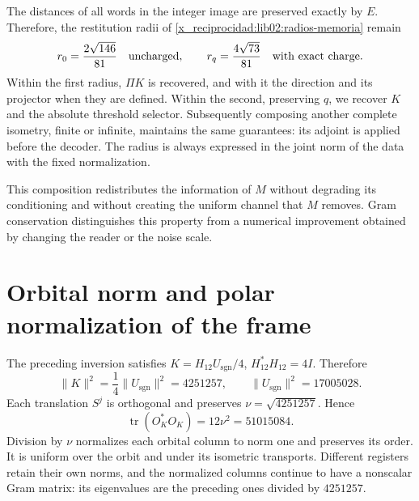 The distances of all words in the integer image are preserved
exactly by \(E\). Therefore, the restitution radii of
\cref{x_reciprocidad:lib02:radios-memoria} remain
\begin{equation}
 r_0=\frac{2\sqrt{146}}{81}\quad\hbox{uncharged},\qquad
 r_q=\frac{4\sqrt{73}}{81}\quad\hbox{with exact charge}.
 \label{x_reciprocidad:lib04:radios}
\end{equation}
Within the first radius, \(\Pi K\) is recovered, and with it the
direction and its projector when they are defined. Within the second,
preserving \(q\), we recover \(K\) and the absolute threshold
selector. Subsequently composing another complete isometry, finite or infinite,
maintains the same guarantees: its adjoint is applied before the
decoder. The radius is always expressed in the joint norm
of the data with the fixed normalization.

This composition redistributes the information of \(M\) without degrading
its conditioning and without creating the uniform channel that \(M\) removes.
Gram conservation distinguishes this property from a numerical
improvement obtained by changing the reader or the noise scale.

\section{Orbital norm and polar normalization of the frame}
\label{x_reciprocidad:lib04:normalizacion}

The preceding inversion satisfies
\(K=H_{12}U_{\mathrm{sgn}}/4\),
\(H_{12}^*H_{12}=4I\). Therefore
\begin{equation}
 \|K\|^2=\frac14\|U_{\mathrm{sgn}}\|^2=4251257,
 \qquad \|U_{\mathrm{sgn}}\|^2=17005028.
 \label{x_reciprocidad:lib04:norma-k}
\end{equation}
Each translation \(S^j\) is orthogonal and preserves
\(\nu=\sqrt{4251257}\). Hence
\begin{equation}
 \operatorname{tr}(O_K^*O_K)=12\nu^2=51015084.
 \label{x_reciprocidad:lib04:traza-marco}
\end{equation}
Division by \(\nu\) normalizes each orbital column to norm
one and preserves its order. It is uniform over the orbit and under its
isometric transports. Different registers retain their own
norms, and the normalized columns continue to have a nonscalar
Gram matrix: its eigenvalues are the preceding ones divided by
\(4251257\).

